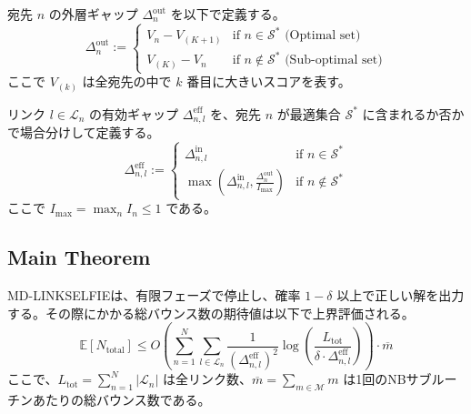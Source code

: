 \documentclass[conference]{IEEEtran}
\begin{document}
\begin{definition}
宛先 $n$ の外層ギャップ $\Delta_{n}^{\mathrm{out}}$ を以下で定義する。
\begin{equation}
    \Delta_{n}^{\mathrm{out}} := \begin{cases}
    V_n - V_{(K+1)} & \text{if } n \in \mathcal{S}^* \text{ (Optimal set)} \\
    V_{(K)} - V_n & \text{if } n \notin \mathcal{S}^* \text{ (Sub-optimal set)}
    \end{cases}
\end{equation}
ここで $V_{(k)}$ は全宛先の中で $k$ 番目に大きいスコアを表す。
\end{definition}

\begin{definition}
リンク $l \in \mathcal{L}_n$ の有効ギャップ $\Delta_{n,l}^{\mathrm{eff}}$ を、宛先 $n$ が最適集合 $\mathcal{S}^*$ に含まれるか否かで場合分けして定義する。
\begin{equation}
    \Delta_{n,l}^{\mathrm{eff}} := \begin{cases}
    \Delta_{n,l}^{\mathrm{in}} & \text{if } n \in \mathcal{S}^* \\
    \max\left( \Delta_{n,l}^{\mathrm{in}}, \frac{\Delta_{n}^{\mathrm{out}}}{I_{\max}} \right) & \text{if } n \notin \mathcal{S}^*
    \end{cases}
\end{equation}
ここで $I_{\max} = \max_{n} I_n \le 1$ である。
\end{definition}

\subsection{Main Theorem}

\begin{theorem}
\label{thm:complexity}
MD-LINKSELFIEは、有限フェーズで停止し、確率 $1-\delta$ 以上で正しい解を出力する。その際にかかる総バウンス数の期待値は以下で上界評価される。
\begin{equation}
    \mathbb{E}[N_{\mathrm{total}}] \le O\left( \sum_{n=1}^{N} \sum_{l \in \mathcal{L}_n} \frac{1}{(\Delta_{n,l}^{\mathrm{eff}})^2} \log \left( \frac{L_{\mathrm{tot}}}{\delta \cdot \Delta_{n,l}^{\mathrm{eff}}} \right) \right) \cdot \overline{m}
\end{equation}
ここで、$L_{\mathrm{tot}} = \sum_{n=1}^{N} |\mathcal{L}_n|$ は全リンク数、$\overline{m} = \sum_{m \in \mathcal{M}} m$ は1回のNBサブルーチンあたりの総バウンス数である。
\end{theorem}
\end{document}
